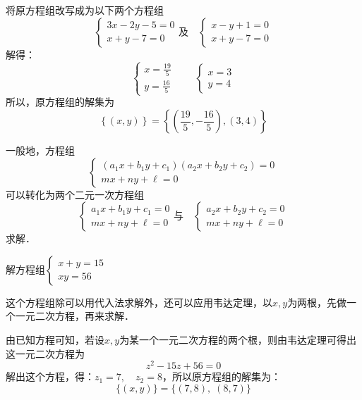 \begin{solution}
    将原方程组改写成为以下两个方程组
\[\begin{cases}
    3x-2y-5=0\\
    x+y-7=0
\end{cases}\text{及}\quad \begin{cases}
    x-y+1=0\\
    x+y-7=0
\end{cases}\]
解得：
\[\begin{cases}
    x=\frac{19}{5}\\ y=\frac{16}{5}
\end{cases}\qquad \begin{cases}
    x=3\\ y=4
\end{cases}\]
所以，原方程组的解集为
\[\left\{(x,y)\right\}=\left\{\left(\frac{19}{5},-\frac{16}{5}\right), (3,4)\right\}\]
\end{solution}
 
一般地，方程组
\[\begin{cases}
(a_1x+b_1y+c_1)(a_2x+b_2y+c_2)=0\\
mx+ny+\ell=0
\end{cases}\]
可以转化为两个二元一次方程组
\[\begin{cases}
a_1x+b_1y+c_1=0\\
mx+ny+\ell=0
\end{cases}\text{与}\quad \begin{cases}
a_2x+b_2y+c_2=0\\
mx+ny+\ell=0
\end{cases}\]
求解．

\begin{example}
解方程组$\begin{cases}
x+y=15\\xy=56
\end{cases}$
\end{example}

\begin{analyze}
这个方程组除可以用代入法求解外，还可以应用韦达定理，以$x,y$为两根，先做一个一元二次方程，再来求解．
\end{analyze}

\begin{solution}
由已知方程可知，若设$x,y$为某一个一元二次方程的两个根，则由韦达定理可得出这一元二次方程为
\[z^2-15z+56=0\]
解出这个方程，得：$z_1=7,\quad z_2=8$，所以原方程组的解集为：
\[\{(x,y)\}=\{(7,8),\; (8,7)\}\]
\end{solution}


